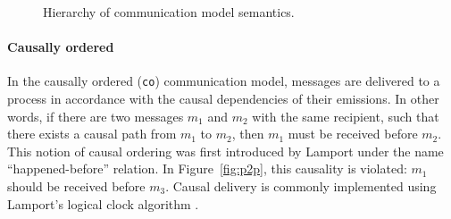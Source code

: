 \bigskip

\begin{figure}[!ht]
\centering
{}
\caption{Hierarchy of communication model semantics.}
\label{fig:coms}
\end{figure}


\paragraph{Causally ordered}
In the causally ordered (\verb|co|) communication model, messages are delivered 
to a process in accordance with the causal dependencies of their emissions. 
In other words, if there are two messages $m_1$ and $m_2$ with the same recipient, 
such that there exists a causal path from $m_1$ to $m_2$, then $m_1$ must be received 
before $m_2$. This notion of causal ordering was first introduced by Lamport under the 
name ``happened-before'' relation. In Figure~\ref{fig:p2p}, this 
causality is violated: $m_1$ should be received before $m_3$. Causal delivery 
is commonly implemented using Lamport's logical clock algorithm \cite{lamport2019time}.


